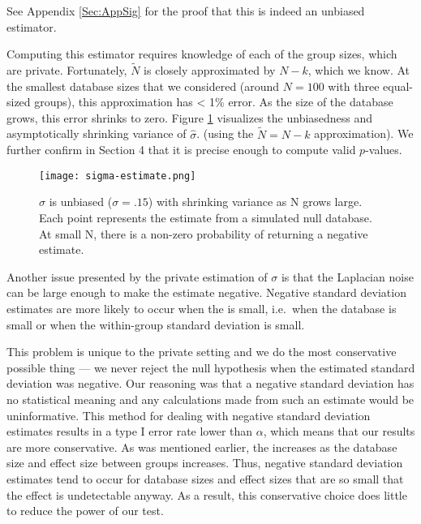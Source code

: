 See Appendix \ref{Sec:AppSig} for the proof that this is indeed an unbiased estimator.  

Computing this estimator requires knowledge of each of the group sizes, which are private. Fortunately, $\tilde{N}$ is closely approximated by $N-k$, which we know. At the smallest database sizes that we considered (around $N = 100$ with three equal-sized groups), this approximation has < 1\% error. As the size of the database grows, this error shrinks to zero.  Figure \ref{fig:sigma-estimate} visualizes the unbiasedness and asymptotically shrinking variance of $\hat{\sigma}$. (using the $\tilde{N} = N-k$ approximation).  We further confirm in Section 4 that it is precise enough to compute valid $p$-values. 


\begin{figure}
\centering
\texttt{[image: sigma-estimate.png]}
\caption{$\hat{\sigma}$ is unbiased ($\sigma = .15$) with shrinking variance as N grows large. Each point represents the estimate from a simulated null database. At small N, there is a non-zero probability of returning a negative estimate.\label{fig:sigma-estimate}}
\end{figure}

Another issue presented by the private estimation of $\sigma$ is that the Laplacian noise can be large enough to make the estimate negative. Negative standard deviation estimates are more likely to occur when the \se is small, i.e.~when the database is small or when the within-group standard deviation is small.

This problem is unique to the private setting and we do the most conservative possible thing --- we never reject the null hypothesis when the estimated standard deviation was negative. Our reasoning was that a negative standard deviation has no statistical meaning and any calculations made from such an estimate would be uninformative.  This method for dealing with negative standard deviation estimates results in a type I error rate lower than $\alpha$, which means that our results are more conservative. As was mentioned earlier, the \sa increases as the database size and effect size between groups increases. Thus, negative standard deviation estimates tend to occur for database sizes and effect sizes that are so small that the effect is undetectable anyway.  As a result, this conservative choice does little to reduce the power of our test.

